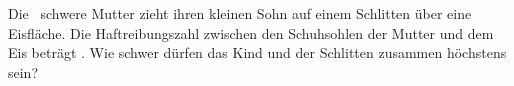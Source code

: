 Die \mMuO\ schwere Mutter zieht ihren kleinen Sohn auf einem Schlitten über eine Eisfläche. Die Haftreibungszahl zwischen den Schuhsohlen der Mutter und dem Eis beträgt \muHO. Wie schwer dürfen das Kind und der Schlitten zusammen höchstens sein?
